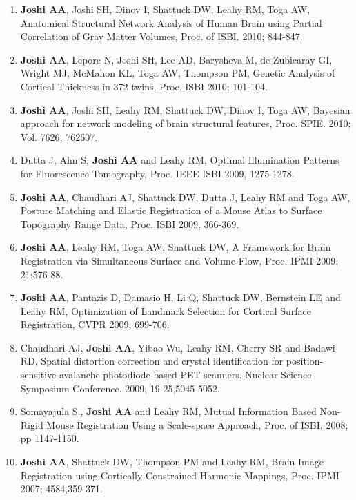 \documentclass[overlapped,line,letterpaper]{res}
\begin{document}
\begin{resume}
\begin{enumerate}
    \item \textbf{Joshi AA}, Joshi SH, Dinov I, Shattuck DW, Leahy RM, Toga AW, {Anatomical Structural Network Analysis of Human Brain using Partial Correlation of Gray Matter Volumes}, Proc. of ISBI. 2010; 844-847.

    \item \textbf{Joshi AA}, Lepore N, Joshi SH, Lee AD, Barysheva M, de Zubicaray GI, Wright MJ, McMahon KL, Toga AW, Thompson PM, {Genetic Analysis of Cortical Thickness in 372 twins}, Proc. ISBI 2010; 101-104.

    \item \textbf{Joshi AA}, Joshi SH, Leahy RM, Shattuck DW, Dinov I, Toga AW, {Bayesian approach for network modeling of brain structural features}, Proc. SPIE. 2010; Vol. 7626, 762607.

    \item Dutta J, Ahn S, \textbf{Joshi AA} and Leahy RM, {Optimal Illumination Patterns for Fluorescence Tomography}, Proc. IEEE ISBI 2009, 1275-1278.

    \item \textbf{Joshi AA}, Chaudhari AJ, Shattuck DW, Dutta J, Leahy RM and Toga AW, {Posture Matching and Elastic Registration of a Mouse Atlas to Surface Topography Range Data}, Proc. ISBI 2009, 366-369.

    \item \textbf{Joshi AA}, Leahy RM, Toga AW, Shattuck DW, {A Framework for Brain Registration via Simultaneous Surface and Volume Flow}, Proc. IPMI 2009; 21:576-88.

    \item \textbf{Joshi AA}, Pantazis D, Damasio H, Li Q, Shattuck DW, Bernstein LE and Leahy RM, {Optimization of Landmark Selection for Cortical Surface Registration}, CVPR 2009, 699-706. 

    \item Chaudhari AJ, \textbf{Joshi AA}, Yibao Wu, Leahy RM, Cherry SR and Badawi RD, {Spatial distortion correction and crystal identification for position-sensitive avalanche photodiode-based PET scanners}, Nuclear Science Symposium Conference. 2009; 19-25,5045-5052.

    \item Somayajula S., \textbf{Joshi AA}  and Leahy RM, {Mutual Information Based Non-Rigid Mouse Registration Using a  Scale-space Approach}, Proc. of ISBI. 2008; pp 1147-1150. 

    \item \textbf{Joshi AA}, Shattuck DW, Thompson PM and Leahy RM, {Brain Image Registration using Cortically Constrained Harmonic Mappings}, Proc. IPMI 2007; 4584,359-371.


\end{enumerate}
\end{resume}
\end{document}
